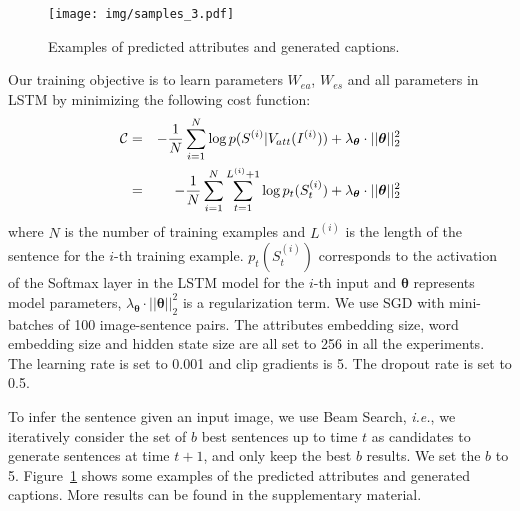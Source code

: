\documentclass[10pt,journal,compsoc]{IEEEtran}
\newcommand{\ie}{\emph{i.e.}}
\def\Att{{V_{att}}}
\def\ModParms{{\boldsymbol \theta}}
\begin{document}
\begin{figure}[t]
\begin{center}
   \texttt{[image: img/samples\_3.pdf]}
\end{center}
\vspace{-10pt}
   \caption{Examples of predicted attributes and generated captions.}
   \vspace{-7pt}
   \label{att_caP_examples}
\end{figure}

Our training objective is to learn parameters $W_{ea}$, $W_{es}$ and all parameters in LSTM by minimizing the following cost function:
\begin{eqnarray}
    \mathcal{C}&=&-\frac{1}{N}\sum_{i=1}^N\log p(S^{(i)}|\Att(I^{(i)}))+\lambda_\ModParms\cdot||\ModParms||_2^2 \\
    &=&-\frac{1}{N}\sum_{i=1}^N\sum_{t=1}^{L^{(i)}+1}\log p_t(S_t^{(i)})+\lambda_\ModParms\cdot||\ModParms||_2^2
    \vspace{-3pt}
\end{eqnarray}
where $N$ is the number of training examples and $L^{(i)}$ is the length of the sentence for the $i$-th training example. $p_t(S_t^{(i)})$ corresponds to the activation of the Softmax layer in the LSTM model for the $i$-th input and $\ModParms$ represents model parameters, $\lambda_\ModParms\cdot||\ModParms||_2^2$ is a regularization term. We use SGD with mini-batches of 100 image-sentence pairs. The attributes embedding size, word embedding size and hidden state size are all set to 256 in all the experiments. The learning rate is set to 0.001 and clip gradients is 5. The dropout rate is set to 0.5.

To infer the sentence given an input image, we use Beam Search, \ie, we iteratively consider the set of $b$ best sentences up to time $t$ as candidates to generate sentences at time $t+1$, and only keep the best $b$ results. We set the $b$ to 5. Figure~\ref{att_caP_examples} shows some examples of the predicted attributes and generated captions. More results can be found in the supplementary material.
 
\end{document}
